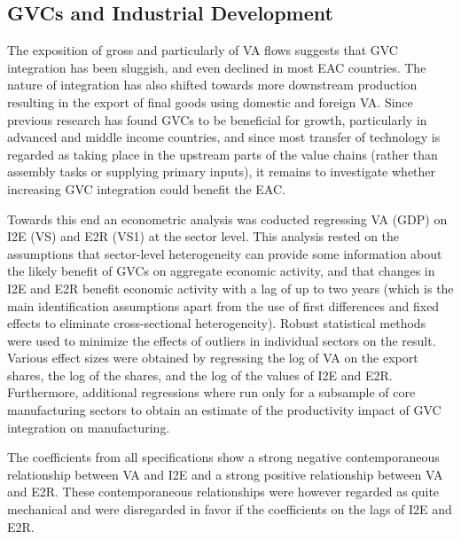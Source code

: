 \documentclass[a4paper]{article}
\begin{document}
\subsection{GVCs and Industrial Development} 

The exposition of gross and particularly of VA flows suggests that GVC integration has been sluggish, and even declined in most EAC countries. The nature of integration has also shifted towards more downstream production resulting in the export of final goods using domestic and foreign VA. Since previous research has found GVCs to be beneficial for growth, particularly in advanced and middle income countries, and since most transfer of technology is regarded as taking place in the upstream parts of the value chains (rather than assembly tasks or supplying primary inputs), it remains to investigate whether increasing GVC integration could benefit the EAC. \newline

Towards this end an econometric analysis was coducted regressing VA (GDP) on I2E (VS) and E2R (VS1) at the sector level. This analysis rested on the assumptions that sector-level heterogeneity can provide some information about the likely benefit of GVCs on aggregate economic activity, and that changes in I2E and E2R benefit economic activity with a lag of up to two years (which is the main identification assumptions apart from the use of first differences and fixed effects to eliminate cross-sectional heterogeneity). Robust statistical methods were used to minimize the effects of outliers in individual sectors on the result. Various effect sizes were obtained by regressing the log of VA on the export shares, the log of the shares, and the log of the values of I2E and E2R. Furthermore, additional regressions where run only for a subsample of core manufacturing sectors to obtain an estimate of the productivity impact of GVC integration on manufacturing. \newline

The coefficients from all specifications show a strong negative contemporaneous relationship between VA and I2E and a strong positive relationship between VA and E2R. These contemporaneous relationships were however regarded as quite mechanical and were disregarded in favor if the coefficients on the lags of I2E and E2R. \newline
\end{document}
